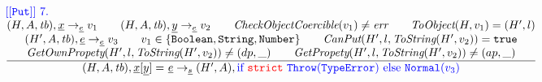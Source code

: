 \[\begin{array}{l@{~~}l@{~~}ll}
{\inblue {\tt[[Put]]}\ 7.}\\
\frac{\begin{matrix}
\evale, \irid \rightarrow_{\ir\expr} v_1
\rulesep
\evale, \ir{y} \rightarrow_{\ir\expr} v_2
\rulesep
\hf{CheckObjectCoercible}(v_1) \not= \err
\rulesep
\hf{ToObject}(H, v_1) = (H',l)
\\
(H', A, \tb), \irexpr \rightarrow_{\ir\expr} v_3
\rulesep
v_1 \in \{{\tt Boolean, String, Number}\}
\rulesep
\hf{CanPut}(H', l, \hf{ToString}(H', v_2)) = \true
\\
\hf{GetOwnPropety}(H', l, \hf{ToString}(H', v_2)) \not= (dp, \_)
\rulesep
\hf{GetPropety}(H', l, \hf{ToString}(H', v_2)) \not= (ap, \_)
\end{matrix}}{\begin{matrix}
\state, \irid{\tt[}\ir{y}{\tt] =} \ \irexpr \rightarrow_{\ir\stmt}
(H',A), \reject
\end{matrix}}
\\[4em]

\end{array}
\]



